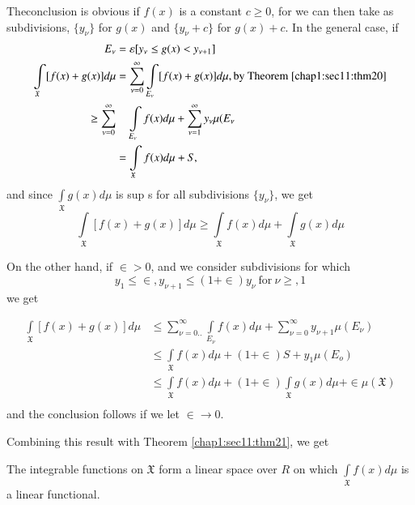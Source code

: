 The\pageoriginale conclusion is obvious if $f(x)$ is a constant $c \geq 0$, for we can
then take as subdivisions, $\{ y_{\nu}\}$ for $g(x)$ and $\{
y_{\nu}+c\}$ for $g(x) + c$. In the general case, if 
\begin{equation*}
  \begin{aligned}
    E_{\nu} &= \varepsilon[y_{\nu}\leq g(x)<y_{\nu+1}]\\
    \int\limits_{\mathfrak{X}}[f(x) + g(x)] d \mu & = \sum^{\infty}_{\nu=0}
    \int\limits_{E_{\nu}}[f(x)+g(x)]d \mu , \text{by
      Theorem \ref{chap1:sec11:thm20}}\\   
    \geq \sum^{\infty}_{v=0} & \quad \int\limits_{E_{\nu}}f(x) d \mu +
    \sum^{\infty}_{\nu = 1} y_{\nu}\mu(E_{\nu}\\ 
    &=\int\limits_{\mathfrak{X}} f(x) d \mu + S,
  \end{aligned}
\end{equation*} 
and since $\int \limits_{\mathfrak{X}} g(x) d \mu$ is sup s for
all subdivisions $\{ y_{\nu}\}$, we get 
$$
\int\limits_{\mathfrak{X}}[f(x) + g(x)]d  \mu \geq \int
\limits_{\mathfrak{X}}f(x)d \mu + \int \limits_{\mathfrak{X}}
g(x) d \mu 
$$ 

On the other hand, if $\in >0$, and we consider subdivisions for which
$$
y_1 \leq \in , y_{\nu+1} \leq (1+\in)y_{\nu}~ \text{for}~\nu \geq ,1
$$
we get

\begin{equation*}
  \begin{aligned}
    \int\limits_{\mathfrak{X}}[f(x)+g(x)] d \mu &\leq 
    \sum^{\infty}_{\nu=0..} \int\limits_{E_{\nu}} f(x) d\mu +
    \sum^{\infty}_{\nu=0} y_{\nu+1}\mu(E_{\nu})\\ 
    &\leq \int\limits_{\mathfrak{X}} f(x) d \mu + (1+\in)S+y_1 \mu (E_o)\\
    &\leq \int\limits_{\mathfrak{X}} f(x) d\mu + (1+\in)
    \int\limits_{\mathfrak{X}} g(x) d \mu + \in\mu (\mathfrak{X})\\ 
  \end{aligned}
\end{equation*}
and the conclusion follows if we let $\in \rightarrow 0$.

Combining this result with Theorem \ref{chap1:sec11:thm21}, we get

\begin{theorem}\label{chap1:sec12:thm29} 
  The integrable functions on $\mathfrak{X}$ form a linear space over $R$
  on which $\int\limits_{\mathfrak{X}} f(x)d\mu$ is a linear functional. 
\end{theorem}

